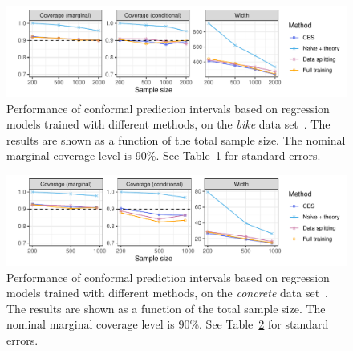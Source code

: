 \begin{figure}[!htb]
    \centering
    \includegraphics[width=0.8\linewidth]{figures/exp_regression_bike.pdf}
    \caption{Performance of conformal prediction intervals based on regression models trained with different methods, on the {\em bike} data set~\cite{data-bike}. The results are shown as a function of the total sample size. The nominal marginal coverage level is 90\%. See Table~\ref{fig:exp_regression_bike} for standard errors.}
    \label{fig:exp_regression_bike}
\end{figure}

\begin{figure}[!htb]
    \centering
    \includegraphics[width=0.8\linewidth]{figures/exp_regression_concrete.pdf}
    \caption{Performance of conformal prediction intervals based on regression models trained with different methods, on the {\em concrete} data set~\cite{data-concrete}. The results are shown as a function of the total sample size. The nominal marginal coverage level is 90\%. See Table~\ref{fig:exp_regression_concrete} for standard errors.}
    \label{fig:exp_regression_concrete}
\end{figure}

\begin{table}[!htb]
\centering
    \caption{Performance of outlier detection based on classification models trained with different methods, on the {\em CIFAR10} data set~\cite{cifar10}. Other details are as in Figure~\ref{fig:exp_oc}. The numbers in parenthesis indicate standard errors. The numbers in bold highlight TPR values within 1 standard error of the best TPR across all methods, for each sample size.}
  \label{tab:exp_oc}
  
\end{table}

\begin{table}[!htb]
\centering
    \caption{Performance of multi-class classification based on classification models trained with different methods, on the {\em CIFAR10} data set~\cite{cifar10}. Other details are as in Figure~\ref{fig:exp_mc}. The numbers in parenthesis indicate standard errors. The numbers in bold highlight cardinality values within 1 standard error of the best cardinality across all methods, for each sample size.}
  \label{tab:exp_mc}
  
\end{table}


